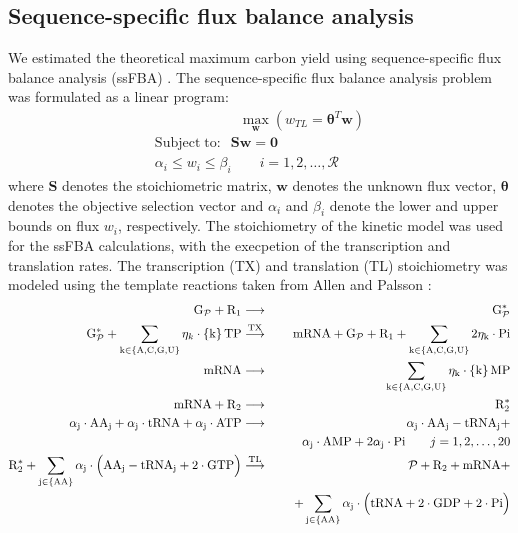 \documentclass[journal=asbcd6,manuscript=article]{achemso}
\begin{document}
\subsection*{Sequence-specific flux balance analysis}
We estimated the theoretical maximum carbon yield using sequence-specific flux balance analysis (ssFBA) \cite{Allen:2003aa}.
The sequence-specific flux balance analysis problem was formulated as a linear program:
\begin{equation}
 \begin{multlined}
	\qquad \qquad \qquad \max_{\boldsymbol{w}}{} \! \left( w_{TL} = \mathbf{\boldsymbol{\theta}}^T \boldsymbol{w} \right) \\
	\mathrm{Subject \; to:}
	 \; \; \mathbf{S}\mathbf{w}=\mathbf{0} \\
\alpha_i \leq w_i \leq \beta_i  \qquad i=1,2,\hdots,\mathcal{R}
 \end{multlined}
\end{equation}
where $\mathbf{S}$ denotes the stoichiometric matrix, $\mathbf{w}$ denotes the unknown flux vector, $\boldsymbol{\theta}$ denotes the objective selection vector
and $\alpha_i$ and $\beta_i$ denote the lower and upper bounds on flux $w_{i}$, respectively.
The stoichiometry of the kinetic model was used for the ssFBA calculations, with the execpetion of the transcription and translation rates.
The transcription (TX) and translation (TL) stoichiometry was modeled using the template reactions taken from Allen and Palsson \cite{Allen:2003aa}:
\begin{eqnarray*}
\mathrm{{G}_{\mathcal{P}}}+\mathrm{{R}_{1}} &\longrightarrow& \mathrm{G_{\mathcal{P}}^{*}} \\
\mathrm{G_{\mathcal{P}}^{*}}+\sum_{\mathrm{k\in\left\{A,C,G,U\right\}}}\eta_{k}\cdot \mathrm{\left\{k\right\}TP} &\overset{\rm TX}{\longrightarrow}& \mathrm{mRNA}+\mathrm{G_{\mathcal{P}}}+\mathrm{R_{1}}+ \mathrm{\sum_{k\in\left\{A,C,G,U\right\}}2\eta_{k}\cdot Pi}\\
\mathrm{mRNA} &\longrightarrow& \mathrm{\sum_{k\in\left\{A,C,G,U\right\}}\eta_{k}\cdot \left\{k\right\}MP} \\
\mathrm{mRNA}+\mathrm{R_{2}} &\longrightarrow& \mathrm{R_{2}^{*}} \\
\mathrm{\alpha_{j}\cdot AA_{j}+\alpha_{j}\cdot tRNA+\alpha_{j}\cdot ATP} &\longrightarrow& \mathrm{\alpha_{j}\cdot AA_{j}-tRNA_{j}+}\\
&& \mathrm{\qquad \alpha_{j}\cdot AMP+2\alpha_{j}\cdot Pi} \qquad{j=1,2,\hdots,20}\\
\mathrm{R_{2}^{*}+\sum_{j\in\left\{AA\right\}}\alpha_{j}\cdot \Big(AA_{j}-tRNA_{j}+2\cdot GTP\Big)} &\stackrel{\rm TL}{\longrightarrow}& \mathcal{P}+\mathrm{R_{2}+mRNA}+\\
&& \mathrm{\quad +\sum_{j\in\left\{AA\right\}}\alpha_{j}\cdot\Big(tRNA+2\cdot GDP+2\cdot Pi\Big)}
\end{eqnarray*}
\end{document}
